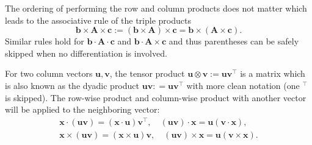 %

The ordering of performing the row and column products does not matter which leads to the associative rule of the triple products
$$
\boldsymbol b\times \boldsymbol A\times \boldsymbol c := (\boldsymbol b\times \boldsymbol A)\times \boldsymbol c = \boldsymbol b\times (\boldsymbol A\times \boldsymbol c).
$$
Similar rules hold for $\boldsymbol b\cdot \boldsymbol A\cdot \boldsymbol c$ and $\boldsymbol b\cdot \boldsymbol A\times \boldsymbol c$ and thus parentheses can be safely skipped when no differentiation is involved. 

For two column vectors $\boldsymbol u, \boldsymbol v$, the tensor product $\boldsymbol u\otimes \boldsymbol v := \boldsymbol u\boldsymbol v^{\intercal}$ is a matrix which is also known as the dyadic product $\boldsymbol u\boldsymbol v: = \boldsymbol u\boldsymbol v^{\intercal}$ with more clean notation (one $^{\intercal}$ is skipped). The row-wise product and column-wise product with another vector will be applied to the neighboring vector:
\begin{align}
\label{eq:xuv}
\boldsymbol x\cdot (\boldsymbol u\boldsymbol v) = (\boldsymbol x\cdot \boldsymbol u) \boldsymbol v^{\intercal}, \quad (\boldsymbol u\boldsymbol v)\cdot \boldsymbol x = \boldsymbol u (\boldsymbol v\cdot \boldsymbol x), \\
\label{eq:xtimesuv}
\boldsymbol x\times (\boldsymbol u\boldsymbol v) = (\boldsymbol x\times \boldsymbol u) \boldsymbol v, \quad (\boldsymbol u\boldsymbol v)\times \boldsymbol x = \boldsymbol u (\boldsymbol v\times \boldsymbol x).
\end{align}


